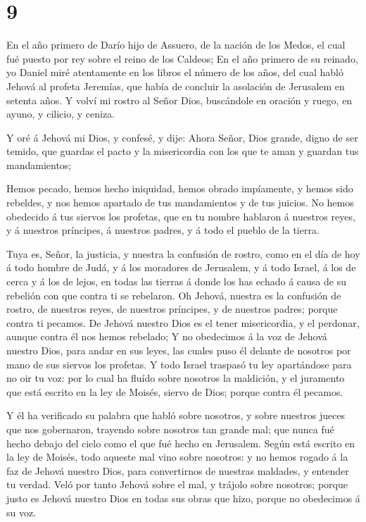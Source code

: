 \hypertarget{section-8}{%
\section{9}\label{section-8}}

 En el año primero de Darío hijo de Assuero, de la nación de
los Medos, el cual fué puesto por rey sobre el reino de los Caldeos;
 En el año primero de su reinado, yo Daniel miré atentamente
en los libros el número de los años, del cual habló Jehová al profeta
Jeremías, que había de concluir la asolación de Jerusalem en setenta
años.  Y volví mi rostro al Señor Dios, buscándole en
oración y ruego, en ayuno, y cilicio, y ceniza.

 Y oré á Jehová mi Dios, y confesé, y dije: Ahora Señor,
Dios grande, digno de ser temido, que guardas el pacto y la misericordia
con los que te aman y guardan tus mandamientos;

 Hemos pecado, hemos hecho iniquidad, hemos obrado
impíamente, y hemos sido rebeldes, y nos hemos apartado de tus
mandamientos y de tus juicios.  No hemos obedecido á tus
siervos los profetas, que en tu nombre hablaron á nuestros reyes, y á
nuestros príncipes, á nuestros padres, y á todo el pueblo de la tierra.

 Tuya es, Señor, la justicia, y nuestra la confusión de
rostro, como en el día de hoy á todo hombre de Judá, y á los moradores
de Jerusalem, y á todo Israel, á los de cerca y á los de lejos, en todas
las tierras á donde los has echado á causa de su rebelión con que contra
ti se rebelaron.  Oh Jehová, nuestra es la confusión de
rostro, de nuestros reyes, de nuestros príncipes, y de nuestros padres;
porque contra ti pecamos.  De Jehová nuestro Dios es el
tener misericordia, y el perdonar, aunque contra él nos hemos rebelado;
 Y no obedecimos á la voz de Jehová nuestro Dios, para
andar en sus leyes, las cuales puso él delante de nosotros por mano de
sus siervos los profetas.  Y todo Israel traspasó tu ley
apartándose para no oir tu voz: por lo cual ha fluído sobre nosotros la
maldición, y el juramento que está escrito en la ley de Moisés, siervo
de Dios; porque contra él pecamos.

 Y él ha verificado su palabra que habló sobre nosotros, y
sobre nuestros jueces que nos gobernaron, trayendo sobre nosotros tan
grande mal; que nunca fué hecho debajo del cielo como el que fué hecho
en Jerusalem.  Según está escrito en la ley de Moisés, todo
aqueste mal vino sobre nosotros: y no hemos rogado á la faz de Jehová
nuestro Dios, para convertirnos de nuestras maldades, y entender tu
verdad.  Veló por tanto Jehová sobre el mal, y trájolo
sobre nosotros; porque justo es Jehová nuestro Dios en todas sus obras
que hizo, porque no obedecimos á su voz.


